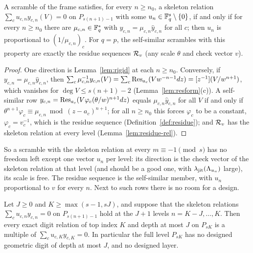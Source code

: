\begin{corollary}\label{cor:residuerows}
A scramble of the frame satisfies, for every $n\ge n_0$, a skeleton relation $\sum_cu_{c,n}y_{c,n}(V)=0$ on $P_{s(n+1)-1}$ with some $u_n\in\mathbb{F}_q^s\setminus\{0\}$, if and only if for every $n\ge n_0$ there are $\mu_{c,n}\in\mathbb{F}_q^*$ with $y_{c,n}=\mu_{c,n}\hat y_{c,n}$ for all $c$; then $u_n$ is proportional to $(1/\mu_{c,n})_c$. For $q=p$, the self-similar scrambles with this property are exactly the residue sequences $\mathcal{R}_v$ (any scale $\theta$ and check vector $v$).
\end{corollary}

\begin{proof}
One direction is Lemma~\ref{lem:rigid} at each $n\ge n_0$. Conversely, if $y_{c,n}=\mu_{c,n}\hat y_{c,n}$, then $\sum_c\mu_{c,n}^{-1}y_{c,n}(V)=\sum_c\operatorname{Res}_{a_c}(Vw^{-n-1}dz)=[z^{-1}](V/w^{n+1})$, which vanishes for $\deg V\le s(n+1)-2$ (Lemma~\ref{lem:resform}(c)). A self-similar row $y_{c,n}=\operatorname{Res}_{a_c}(V\varphi_c(\theta/w)^{n+1}dz)$ equals $\mu_{c,n}\hat y_{c,n}$ for all $V$ if and only if $\theta^{n+1}\varphi_c\equiv\mu_{c,n}\bmod(z-a_c)^{n+1}$; for all $n\ge n_0$ this forces $\varphi_c$ to be a constant, $\varphi_c=v_c^{-1}$, which is the residue sequence (Definition~\ref{def:residue}); and $\mathcal{R}_v$ has the skeleton relation at every level (Lemma~\ref{lem:residue-rel}).
\end{proof}

So a scramble with the skeleton relation at every $m\equiv-1\pmod s$ has no freedom left except one vector $u_n$ per level: its direction is the check vector of the skeleton relation at that level (and should be a good one, with $\lambda_{\mathrm{jit}}(\Lambda_{u_n})$ large), its scale is free. The residue sequence is the self-similar member, with $u_n$ proportional to $v$ for every $n$. Next to such rows there is no room for a design.

\begin{corollary}\label{cor:nodesign}
Let $J\ge0$ and $K\ge\max(s-1,sJ)$, and suppose that the skeleton relations $\sum_cu_{c,n}y_{c,n}=0$ on $P_{s(n+1)-1}$ hold at the $J+1$ levels $n=K-J,\dots,K$. Then every exact digit relation of top index $K$ and depth at most $J$ on $P_{sK}$ is a multiple of $\sum_cu_{c,K}y_{c,K}=0$. In particular the full level $P_{sK}$ has no designed geometric digit of depth at most $J$, and no designed layer.
\end{corollary}

